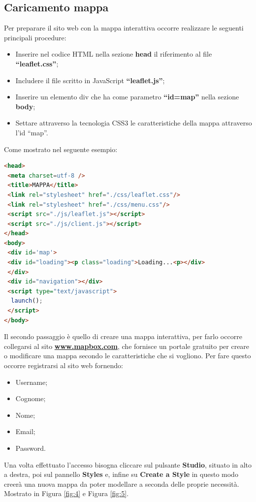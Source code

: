\documentclass[a4paper,11pt]{article}
\begin{document}
\subsection{Caricamento mappa}
\label{sec:3.1}
Per preparare il sito web con la mappa interattiva occorre realizzare le seguenti principali procedure:
\begin{itemize}
	\item Inserire nel codice HTML nella sezione \textbf{head} il riferimento al file \textbf{"`leaflet.css"'};
	\item Includere il file scritto in JavaScript \textbf{"`leaflet.js"'};
	\item Inserire un elemento div che ha come parametro \textbf{"`id=map"'} nella sezione \textbf{body};
	\item Settare attraverso la tecnologia CSS3 le caratteristiche della mappa attraverso l'id "`map"'.				
\end{itemize}
Come mostrato nel seguente esempio:
\begin{lstlisting}[language=HTML, basicstyle=\small]
<head>
 <meta charset=utf-8 />
 <title>MAPPA</title>
 <link rel="stylesheet" href="./css/leaflet.css"/>
 <link rel="stylesheet" href="./css/menu.css"/>		
 <script src="./js/leaflet.js"></script>
 <script src="./js/client.js"></script>		
</head>
<body>		
 <div id='map'>
 <div id="loading"><p class="loading">Loading...<p></div>
 </div>					
 <div id="navigation"></div>		
 <script type="text/javascript">
  launch();
 </script>
</body>
\end{lstlisting}
Il secondo passaggio è quello di creare una mappa interattiva, per farlo occorre collegarsi al sito \textbf{\url{www.mapbox.com}}, che fornisce un portale gratuito per creare o modificare una mappa secondo le caratteristiche che si vogliono.
Per fare questo occorre registrarsi al sito web fornendo:
\begin{itemize}
	\item Username;
	\item Cognome;
	\item Nome;
	\item Email;
	\item Password.
\end{itemize}
Una volta effettuato l'accesso bisogna cliccare sul pulsante \textbf{Studio}, situato in alto a destra, poi sul pannello \textbf{Styles} e, infine su \textbf{Create a Style} in questo modo creerà una nuova mappa da poter modellare a seconda delle proprie necessità. Mostrato in Figura \ref{fig:4} e Figura \ref{fig:5}.
\end{document}
